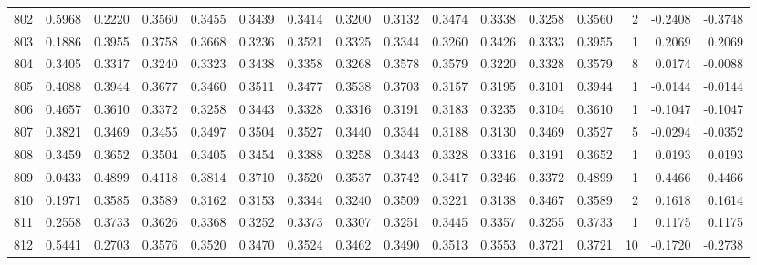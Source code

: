 \begin{tabular}{lrrrrrrrrrrrrrrr}
802 &      0.5968 &  0.2220 &  0.3560 &  0.3455 &  0.3439 &  0.3414 &  0.3200 &  0.3132 &  0.3474 &  0.3338 &   0.3258 &     0.3560 &      2 &                   -0.2408 &                    -0.3748 \\
803 &      0.1886 &  0.3955 &  0.3758 &  0.3668 &  0.3236 &  0.3521 &  0.3325 &  0.3344 &  0.3260 &  0.3426 &   0.3333 &     0.3955 &      1 &                    0.2069 &                     0.2069 \\
804 &      0.3405 &  0.3317 &  0.3240 &  0.3323 &  0.3438 &  0.3358 &  0.3268 &  0.3578 &  0.3579 &  0.3220 &   0.3328 &     0.3579 &      8 &                    0.0174 &                    -0.0088 \\
805 &      0.4088 &  0.3944 &  0.3677 &  0.3460 &  0.3511 &  0.3477 &  0.3538 &  0.3703 &  0.3157 &  0.3195 &   0.3101 &     0.3944 &      1 &                   -0.0144 &                    -0.0144 \\
806 &      0.4657 &  0.3610 &  0.3372 &  0.3258 &  0.3443 &  0.3328 &  0.3316 &  0.3191 &  0.3183 &  0.3235 &   0.3104 &     0.3610 &      1 &                   -0.1047 &                    -0.1047 \\
807 &      0.3821 &  0.3469 &  0.3455 &  0.3497 &  0.3504 &  0.3527 &  0.3440 &  0.3344 &  0.3188 &  0.3130 &   0.3469 &     0.3527 &      5 &                   -0.0294 &                    -0.0352 \\
808 &      0.3459 &  0.3652 &  0.3504 &  0.3405 &  0.3454 &  0.3388 &  0.3258 &  0.3443 &  0.3328 &  0.3316 &   0.3191 &     0.3652 &      1 &                    0.0193 &                     0.0193 \\
809 &      0.0433 &  0.4899 &  0.4118 &  0.3814 &  0.3710 &  0.3520 &  0.3537 &  0.3742 &  0.3417 &  0.3246 &   0.3372 &     0.4899 &      1 &                    0.4466 &                     0.4466 \\
810 &      0.1971 &  0.3585 &  0.3589 &  0.3162 &  0.3153 &  0.3344 &  0.3240 &  0.3509 &  0.3221 &  0.3138 &   0.3467 &     0.3589 &      2 &                    0.1618 &                     0.1614 \\
811 &      0.2558 &  0.3733 &  0.3626 &  0.3368 &  0.3252 &  0.3373 &  0.3307 &  0.3251 &  0.3445 &  0.3357 &   0.3255 &     0.3733 &      1 &                    0.1175 &                     0.1175 \\
812 &      0.5441 &  0.2703 &  0.3576 &  0.3520 &  0.3470 &  0.3524 &  0.3462 &  0.3490 &  0.3513 &  0.3553 &   0.3721 &     0.3721 &     10 &                   -0.1720 &                    -0.2738 \\

\end{tabular}
